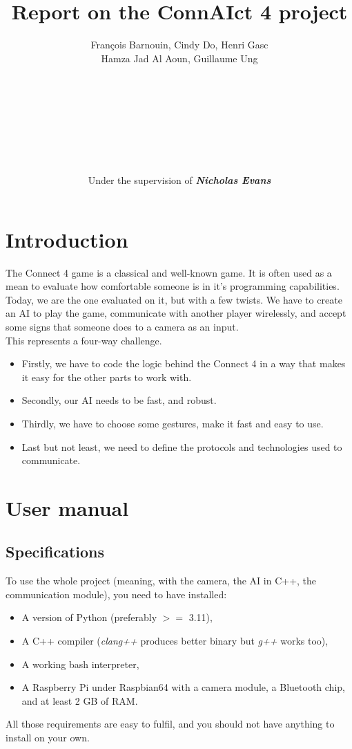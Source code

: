 \documentclass[11pt, a4paper, oneside]{report}
\title{\textbf{Report on the ConnAIct 4 project}}
\author{\normalsize François Barnouin, Cindy Do, Henri Gasc\\\normalsize Hamza Jad Al Aoun, Guillaume Ung\\\\\\\\\\\\\\\\\\Under the supervision of \textbf{\textit{Nicholas Evans}}}
\date{}
\begin{document}
	\marginsize{2.5cm}{2.5cm}{3cm}{3cm}
	\maketitle
	\tableofcontents

	\chapter{Introduction}
	The Connect 4 game is a classical and well-known game. It is often used as a mean to evaluate how comfortable someone is in it's programming capabilities. \\
	Today, we are the one evaluated on it, but with a few twists. We have to create an AI to play the game, communicate with another player wirelessly, and accept some signs that someone does to a camera as an input. \\
	This represents a four-way challenge.
	\begin{itemize}
		\item Firstly, we have to code the logic behind the Connect 4 in a way that makes it easy for the other parts to work with.
		\item Secondly, our AI needs to be fast, and robust.
		\item Thirdly, we have to choose some gestures, make it fast and easy to use.
		\item Last but not least, we need to define the protocols and technologies used to communicate.
	\end{itemize}

	\chapter{User manual}

	\section{Specifications}
	To use the whole project (meaning, with the camera, the AI in C++, the communication module), you need to have installed:
	\begin{itemize}
		\item A version of Python (preferably \(>=\) 3.11),
		\item A C++ compiler (\textit{clang++} produces better binary but \textit{g++} works too),
		\item A working bash interpreter,
		\item A Raspberry Pi under Raspbian64 with a camera module, a Bluetooth chip, and at least 2 GB of RAM.\@
	\end{itemize}
	All those requirements are easy to fulfil, and you should not have anything to install on your own. \\
\end{document}
